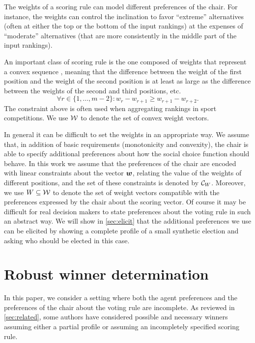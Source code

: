 \documentclass[sigconf, anonymous]{aamas}
\begin{document}
The weights of a scoring rule can model different preferences of the chair. 
For instance, the weights can control the inclination to favor ``extreme'' alternatives (often at either the top or the bottom of the input rankings) at the expenses of ``moderate'' alternatives (that are more consistently in the middle part of the input rankings). 

An important class of scoring rule is the one composed of weights that represent a convex sequence \citep{Stein1994,Llamazares2016}, meaning that the difference between the weight of the first position and the weight of the second position is at least as large as the difference between the weights of the second and third positions, etc.
\begin{equation} 
	\label{eq:convexity}
	\forall r \in \{1,\ldots,m-2\}: w_r - w_{r+1} \geq w_{r+1}-w_{r+2}.
\end{equation}
The constraint above is often used when aggregating rankings in sport competitions.
We use $\mathcal{W}$ to denote the set of convex weight vectors.

In general it can be difficult to set the weights in an appropriate way.
We assume that, in addition of basic requirements (monotonicity and convexity), the chair is able to specify additional preferences about how the social choice function should behave.
In this work we assume that the preferences of the chair are encoded with linear constraints about the vector $\bm{w}$, relating the value of the weights of different positions, and the set of these constraints is denoted by $\mathcal{C}_W$. Moreover, we use $W \subseteq \mathcal{W}$ to denote the set of weight vectors compatible with the preferences expressed by the chair about the scoring vector.
Of course it may be difficult for real decision makers to state preferences about the voting rule in such an abstract way.
We will show in \cref{sec:elicit} that the additional preferences we use can be elicited by 
showing a complete profile of a small synthetic election and asking who should be elected in this case.

\section{Robust winner determination}
\label{sec:mmr}
In this paper, we consider a setting where both the agent preferences and the preferences of the chair about the voting rule are incomplete.
As reviewed in \cref{sec:related}, some authors have considered possible and necessary winners assuming 
either a partial profile or assuming an incompletely specified scoring rule.
\end{document}
